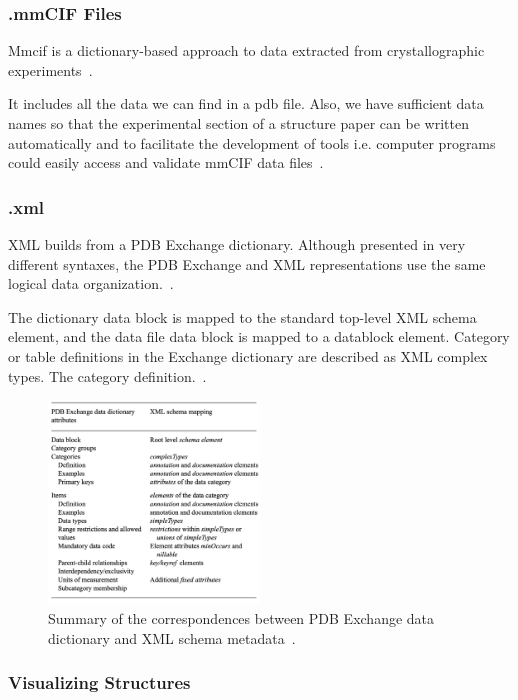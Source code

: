 \documentclass{report}
\begin{document}
\subsubsection{.mmCIF Files}
Mmcif is a dictionary-based approach to data extracted from crystallographic experiments~\cite{westbrook_pdb_2003}.

It includes all the data we can find in a pdb file. Also, we have sufficient data names so that the experimental section of a structure paper can be written automatically and to facilitate the development of tools i.e. computer programs could easily access and validate mmCIF data files~\cite{westbrook_pdb_2003}.

\subsubsection{.xml}

XML builds from a PDB Exchange dictionary. Although presented in very different syntaxes, the PDB Exchange and XML representations use the same logical data organization.~\cite{westbrook_pdbml_2005}.

The dictionary data block is mapped to the standard top-level XML schema element, and the data file data block is mapped to a datablock element. Category or table definitions in the Exchange dictionary are described as XML complex types. The category definition.~\cite{westbrook_pdbml_2005}.

\begin{figure}[H]
    \centering
    \includegraphics[width=0.5\textwidth]{xml.png}
    \caption{\label{fig:xml}Summary of the correspondences between PDB Exchange data dictionary and XML schema metadata~\cite{westbrook_pdbml_2005}.}
\end{figure}


\subsubsection{Visualizing Structures}
\end{document}
